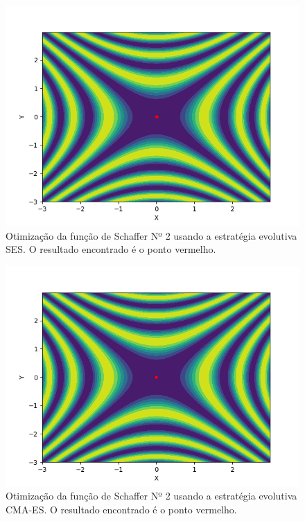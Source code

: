 \documentclass[conference]{IEEEtran}
\begin{document}
\begin{figure}[htbp]
\centering
\centerline{\includegraphics[scale=0.6]{imagens/schaffer2d/ses.png}}
\caption{Otimização da função de Schaffer Nº 2 usando a estratégia evolutiva SES. O resultado encontrado é o ponto vermelho.}
\label{schaffer2d/ses}
\end{figure} 

\begin{figure}[htbp]
\centering
\centerline{\includegraphics[scale=0.6]{imagens/schaffer2d/cmaes.png}}
\caption{Otimização da função de Schaffer Nº 2 usando a estratégia evolutiva CMA-ES. O resultado encontrado é o ponto vermelho.}
\label{schaffer2d/cmaes}
\end{figure}
\end{document}
